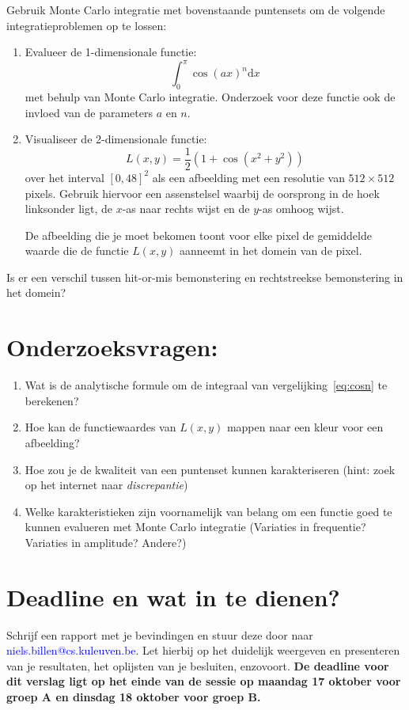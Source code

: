 \documentclass[10pt,a4paper]{article}
\begin{document}
Gebruik Monte Carlo integratie met bovenstaande puntensets om de volgende integratieproblemen op te lossen:
\begin{enumerate}
	\item
	Evalueer de 1-dimensionale functie:
		\begin{equation}
			\int_0^\pi \cos\left(ax\right)^n\mathrm{d}x
			\label{eq:cosn}
		\end{equation}
	met behulp van Monte Carlo integratie. Onderzoek voor deze functie ook de invloed van de parameters $a$ en $n$.
	
	\item 
	Visualiseer de 2-dimensionale functie:
	\begin{equation}
		L\left(x,y\right) = \frac{1}{2}\left(1 + \cos\left(x^2+y^2\right)\right)
	\end{equation}
	over het interval \(\left[0,48\right]^2\) als een afbeelding met een resolutie van \(512 \times 512\) pixels. Gebruik hiervoor een assenstelsel waarbij de oorsprong in de hoek linksonder ligt, de $x$-as naar rechts wijst en de $y$-as omhoog wijst.
	
	De afbeelding die je moet bekomen toont voor elke pixel de gemiddelde waarde die de functie \(L\left(x,y\right)\) aanneemt in het domein van de pixel.
\end{enumerate}

Is er een verschil tussen hit-or-mis bemonstering en rechtstreekse bemonstering in het domein?

\section*{Onderzoeksvragen:}
\begin{enumerate}
	\item Wat is de analytische formule om de integraal van vergelijking~\eqref{eq:cosn} te berekenen?
	\item Hoe kan de functiewaardes van \(L\left(x,y\right)\) mappen naar een kleur voor een afbeelding?
	\item Hoe zou je de kwaliteit van een puntenset kunnen karakteriseren (hint: zoek op het internet naar \textit{discrepantie})
	\item Welke karakteristieken zijn voornamelijk van belang om een functie goed te kunnen evalueren met Monte Carlo integratie (Variaties in frequentie? Variaties in amplitude? Andere?)
\end{enumerate}
\section*{Deadline en wat in te dienen?}

Schrijf een rapport met je bevindingen en stuur deze door naar \textcolor{blue}{niels.billen@cs.kuleuven.be}. Let hierbij
op het duidelijk weergeven en presenteren van je resultaten, het oplijsten van je besluiten, enzovoort.
\textbf{De deadline voor dit verslag ligt op het einde van de sessie op maandag 17 oktober voor groep A en dinsdag 18 oktober voor groep B.}
\end{document}
